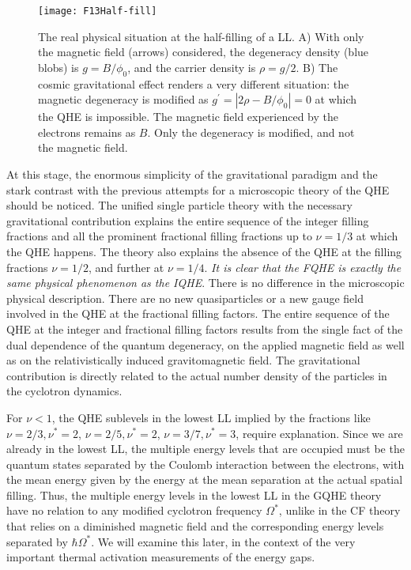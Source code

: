 \documentclass[aps,preprint,12pt,tightenlines]{revtex4}%
\begin{document}
\begin{figure}
	\centering
	\texttt{[image: F13Half-fill]}
	\caption{The real physical situation at the half-filling of a LL. A) With only the magnetic field (arrows) considered, the degeneracy density (blue blobs) is $g=B/\phi_{0}$, and the carrier density is $\rho=g/2$. B) The cosmic gravitational effect renders a very different situation: the magnetic degeneracy is modified as $g^{\prime}=\left\vert 2\rho-B/\phi_{0}\right\vert =0$ at which the QHE is impossible. The magnetic field experienced by the electrons remains as $B$. Only the degeneracy is modified, and not the magnetic field.}
	\label{fig:half-fill}
\end{figure}

At this stage, the enormous simplicity of the gravitational paradigm and the
stark contrast with the previous attempts for a microscopic theory of the QHE
should be noticed. The unified single particle theory with the necessary
gravitational contribution explains the entire sequence of the integer filling
fractions and all the prominent fractional filling fractions up to $\nu=1/3$
at which the QHE happens. The theory also explains the absence of the QHE at
the filling fractions $\nu=1/2$, and further at $\nu=1/4$. \emph{It is clear
that the FQHE is exactly the same physical phenomenon as the IQHE}. There is
no difference in the microscopic physical description. There are no new
quasiparticles or a new gauge field involved in the QHE at the fractional
filling factors. The entire sequence of the QHE at the integer and fractional
filling factors results from the single fact of the dual dependence of the
quantum degeneracy, on the applied magnetic field as well as on the
relativistically induced gravitomagnetic field. The gravitational contribution
is directly related to the actual number density of the particles in the
cyclotron dynamics.

For $\nu<1$, the QHE sublevels in the lowest LL implied by the
fractions like $\nu=2/3,\nu^{\ast}=2$, $\nu=2/5,\nu^{\ast}=2$, $\nu
=3/7,\nu^{\ast}=3$, require explanation. Since we are already in the lowest
LL, the multiple energy levels that are occupied must be the quantum
states separated by the Coulomb interaction between the electrons, with the
mean energy given by the energy at the mean separation at the actual spatial
filling. Thus, the multiple energy levels in the lowest LL in the
GQHE theory have no relation to any modified cyclotron frequency $\Omega
^{\ast}$, unlike in the CF theory that relies on a diminished magnetic field
and the corresponding energy levels separated by $\hbar\Omega^{\ast}$. We will
examine this later, in the context of the very important thermal activation
measurements of the energy gaps.
\end{document}
